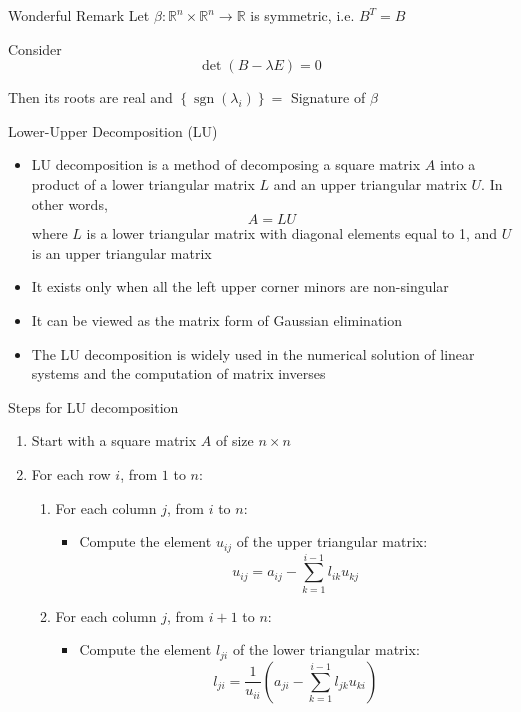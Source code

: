 \documentclass[fullscreen=true, bookmarks=true, hyperref={pdfencoding=unicode}]{beamer}
\begin{document}
\begin{frame}
  \begin{block}{Wonderful Remark}
    Let $\beta: \mathbb{R}^n \times \mathbb{R}^n \to \mathbb{R}$ is symmetric, i.e. $B^T = B$

    Consider $$\det (B - \lambda E) = 0$$
    
    Then its roots are real and $\left\{\operatorname{sgn}(\lambda_i)\right\} = $ Signature of $\beta$
  \end{block}
\end{frame}


\begin{frame}{Lower-Upper Decomposition (LU)}
  \begin{itemize}
    \item LU decomposition is a method of decomposing a square matrix $A$ 
    into a product of a lower triangular matrix $L$ and 
    an upper triangular matrix $U$. 
    In other words,
    \[
    A = LU
    \]
    where $L$ is a lower triangular matrix with diagonal elements equal to 1, 
    and $U$ is an upper triangular matrix
  
    \pause\item It exists only when all the left upper corner minors 
    are non-singular

    \pause\item It can be viewed as the matrix form of Gaussian elimination
    
    \pause\item The LU decomposition is widely used in the numerical solution of 
    linear systems and the computation of matrix inverses
  \end{itemize}
\end{frame}


\begin{frame}{Steps for LU decomposition}
  \begin{enumerate}
    \item Start with a square matrix $A$ of size $n \times n$
    
    \item For each row $i$, from $1$ to $n$:
    \begin{enumerate}
      \item For each column $j$, from $i$ to $n$:
      \begin{itemize}
        \item Compute the element $u_{ij}$ of the upper triangular matrix:
        \[
        u_{ij} = a_{ij} - \sum_{k=1}^{i-1} l_{ik} u_{kj}
        \]
      \end{itemize}
      \item For each column $j$, from $i+1$ to $n$:
      \begin{itemize}
        \item Compute the element $l_{ji}$ of the lower triangular matrix:
        \[
        l_{ji} = \frac{1}{u_{ii}} \left( a_{ji} - \sum_{k=1}^{i-1} l_{jk} u_{ki} \right)
        \]
      \end{itemize}
    \end{enumerate}
  \end{enumerate}  
\end{frame}
\end{document}
